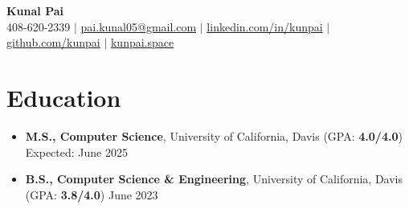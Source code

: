 \documentclass[letterpaper,10pt]{article}
\begin{document}
{\Large
\begin{center}
  \textbf{\Huge Kunal Pai} \\
  \small 408-620-2339 $|$ \href{mailto:pai.kunal05@gmail.com}{pai.kunal05@gmail.com} $|$ 
  \href{https://linkedin.com/in/kunpai}{linkedin.com/in/kunpai} $|$
  \href{https://github.com/kunpai}{github.com/kunpai} $|$
  \href{https://www.kunpai.space}{kunpai.space}
\end{center}
}

\section{Education}
{\normalsize
\begin{itemize}[leftmargin=0.15in, label={}, itemsep=0pt]
  \item \textbf{M.S., Computer Science}, University of California, Davis (GPA: \textbf{4.0/4.0}) \hfill Expected: June 2025
  \item \textbf{B.S., Computer Science \& Engineering}, University of California, Davis (GPA: \textbf{3.8/4.0}) \hfill June 2023
\end{itemize}
}
\end{document}
